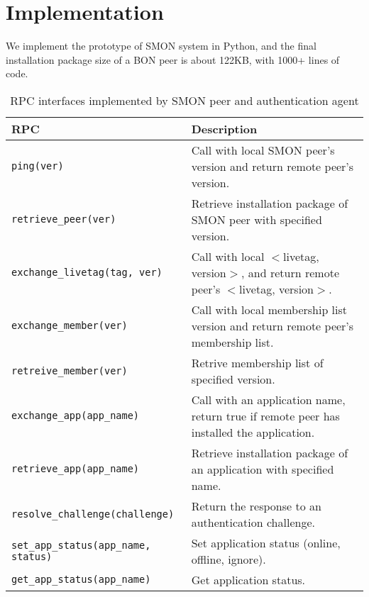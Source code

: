 \section{Implementation}
\label{sec:impl}

We implement the prototype of SMON system in Python, and the
final installation package size of a BON peer is about
122KB, with 1000+ lines of code.

\begin{table*}
\small
\centering
\begin{tabular}{|l|l|}

\hline
\textbf{RPC} & \textbf{Description} \\

\hline
\texttt{ping(ver)} & Call with local SMON peer's version and
return remote peer's version.\\

\hline
\texttt{retrieve\_peer(ver)} & Retrieve installation package
of SMON peer with specified version.\\

\hline
\texttt{exchange\_livetag(tag, ver)} & Call with local
$<$livetag, version$>$, and return remote peer's $<$livetag,
version$>$.\\

\hline
\texttt{exchange\_member(ver)} & Call with local membership
list version and return remote peer's membership list.\\

\hline
\texttt{retreive\_member(ver)} & Retrive membership list of
specified version.\\

\hline
\texttt{exchange\_app(app\_name)} & Call with an application
name, return true if remote peer has installed the
application.\\

\hline
\texttt{retrieve\_app(app\_name)} & Retrieve installation package
of an application with specified name.\\

\hline
\texttt{resolve\_challenge(challenge)} & Return the response
to an authentication challenge.\\

\hline
\texttt{set\_app\_status(app\_name, status)} & Set application status (online,
offline, ignore).\\

\hline
\texttt{get\_app\_status(app\_name)} & Get application status. \\

\hline

\end{tabular}
\caption{RPC interfaces implemented by SMON peer and authentication
agent}
\label{fig:rpc}
\end{table*}

